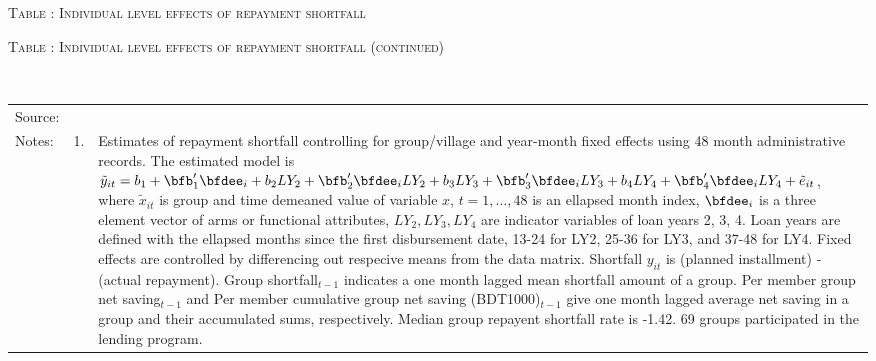 \hspace{-1cm}\begin{minipage}[t]{14cm}
\hfil\textsc{\normalsize Table \thetable: Individual level effects of repayment shortfall\label{tab shortfall indiv o800}}\\
\setlength{\tabcolsep}{1pt}
\setlength{\baselineskip}{8pt}
\renewcommand{\arraystretch}{.6}
\hfil{}
\end{minipage}

\addtocounter{table}{-1}
\hspace{-1cm}\begin{minipage}[t]{14cm}
\hfil\textsc{\normalsize Table \thetable: Individual level effects of repayment shortfall (continued)\label{tab shortfall indiv o800 2}}\\
\setlength{\tabcolsep}{1pt}
\setlength{\baselineskip}{8pt}
\renewcommand{\arraystretch}{.6}
\hfil{}\\
\renewcommand{\arraystretch}{.8}
\setlength{\tabcolsep}{1pt}
\begin{tabular}{>{\hfill\scriptsize}p{1cm}<{}>{\hfill\scriptsize}p{.25cm}<{}>{\scriptsize}p{12cm}<{\hfill}}
Source:& \multicolumn{2}{l}{\scriptsize Estimated with GUK administrative data.}\\
Notes: & 1. & Estimates of repayment shortfall controlling for group/village and year-month fixed effects using 48 month administrative records. The estimated model is $\tilde{y}_{it}=b_{1}+\bfb'_{1}\bfdee_{i}+b_{2}LY_{2}+\bfb'_{2}\bfdee_{i}LY_{2}+b_{3}LY_{3}+\bfb'_{3}\bfdee_{i}LY_{3}+b_{4}LY_{4}+\bfb'_{4}\bfdee_{i}LY_{4}+\tilde{e}_{it}$, where $\tilde{x}_{it}$ is group and time demeaned value of variable $x$, $t=1,\dots, 48$ is an ellapsed month index, $\bfdee_{i}$ is a three element vector of arms or functional attributes, $LY_{2}, LY_{3}, LY_{4}$ are indicator variables of loan years 2, 3, 4. Loan years are defined with the ellapsed months since the first disbursement date, 13-24 for \textsf{LY2}, 25-36 for \textsf{LY3}, and 37-48 for \textsf{LY4}. Fixed effects are controlled by differencing out respecive means from the data matrix. Shortfall $y_{it}$ is (planned installment) - (actual repayment). \textsf{Group shortfall}$_{t-1}$ indicates a one month lagged mean shortfall amount of a group. \textsf{Per member group net saving}$_{t-1}$ and \textsf{Per member cumulative group net saving (BDT1000)}$_{t-1}$ give one month lagged average net saving in a group and their accumulated sums, respectively. Median group repayent shortfall rate is -1.42. 69 groups participated in the lending program. \\

\end{tabular}
\end{minipage}
